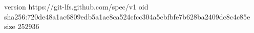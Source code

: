 version https://git-lfs.github.com/spec/v1
oid sha256:720de48a1ac6809edb5a1ae8ca524cfcc304a5cbfbfe7b628ba2409dc8c4c85e
size 252936
